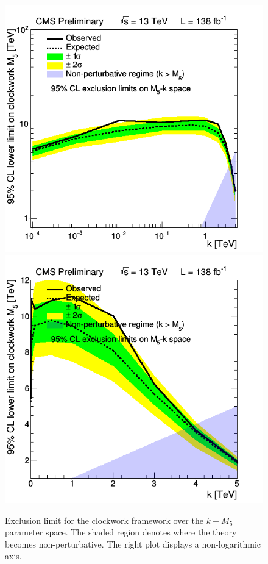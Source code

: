 
\begin{figure}[h!]
     \caption{Exclusion limit for the clockwork framework over the $k-M_5$ parameter space. The shaded region denotes where the theory becomes non-perturbative. The right plot displays a non-logarithmic axis.}
    \centering
    \includegraphics[width=0.49\linewidth]{fig/LIMITPLOT_BBBE161718_CWk_real.png}
    \includegraphics[width=0.47\linewidth]{fig/LIMITPLOT_BBBE161718_CWk_nonLog_real.png}
    \label{Fig:LIMIT_Clockwork_real}
\end{figure}


